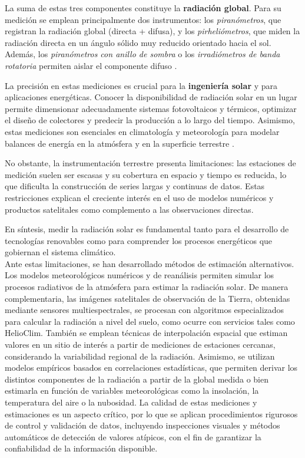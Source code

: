 La suma de estas tres componentes constituye la \textbf{radiación global}. Para su medición se emplean principalmente dos instrumentos: los \textit{piranómetros}, que registran la radiación global (directa + difusa), y los \textit{pirheliómetros}, que miden la radiación directa en un ángulo sólido muy reducido orientado hacia el sol. Además, los \textit{piranómetros con anillo de sombra} o los \textit{irradiómetros de banda rotatoria} permiten aislar el componente difuso \citep{duffie2013}.  

La precisión en estas mediciones es crucial para la \textbf{ingeniería solar} y para aplicaciones energéticas. Conocer la disponibilidad de radiación solar en un lugar permite dimensionar adecuadamente sistemas fotovoltaicos y térmicos, optimizar el diseño de colectores y predecir la producción a lo largo del tiempo. Asimismo, estas mediciones son esenciales en climatología y meteorología para modelar balances de energía en la atmósfera y en la superficie terrestre \citep{wald2018, ieapvps2023}.  

No obstante, la instrumentación terrestre presenta limitaciones: las estaciones de medición suelen ser escasas y su cobertura en espacio y tiempo es reducida, lo que dificulta la construcción de series largas y continuas de datos. Estas restricciones explican el creciente interés en el uso de modelos numéricos y productos satelitales como complemento a las observaciones directas.  

En síntesis, medir la radiación solar es fundamental tanto para el desarrollo de tecnologías renovables como para comprender los procesos energéticos que gobiernan el sistema climático.\\



Ante estas limitaciones, se han desarrollado métodos de estimación alternativos. Los modelos meteorológicos numéricos y de reanálisis permiten simular los procesos radiativos de la atmósfera para estimar la radiación solar. De manera complementaria, las imágenes satelitales de observación de la Tierra, obtenidas mediante sensores multiespectrales, se procesan con algoritmos especializados para calcular la radiación a nivel del suelo, como ocurre con servicios tales como HelioClim. También se emplean técnicas de interpolación espacial que estiman valores en un sitio de interés a partir de mediciones de estaciones cercanas, considerando la variabilidad regional de la radiación. Asimismo, se utilizan modelos empíricos basados en correlaciones estadísticas, que permiten derivar los distintos componentes de la radiación a partir de la global medida o bien estimarla en función de variables meteorológicas como la insolación, la temperatura del aire o la nubosidad. La calidad de estas mediciones y estimaciones es un aspecto crítico, por lo que se aplican procedimientos rigurosos de control y validación de datos, incluyendo inspecciones visuales y métodos automáticos de detección de valores atípicos, con el fin de garantizar la confiabilidad de la información disponible.





